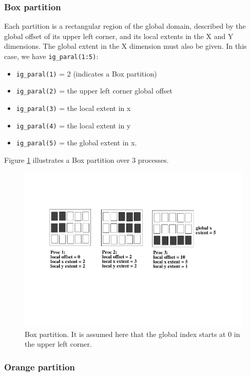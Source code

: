 \subsubsection{Box partition}

Each partition is a rectangular region of the global domain, described
by the global offset of its upper left corner, and its local extents
in the X and Y dimensions. The global extent in the X dimension must
also be given. In this case, we have {\tt ig\_paral(1:5)}:
\begin{itemize}
\item {\tt ig\_paral(1)} = 2 (indicates a Box partition)
\item {\tt ig\_paral(2)} = the upper left corner global offset
\item {\tt ig\_paral(3)} = the local extent in x
\item {\tt ig\_paral(4)} = the local extent in y
\item {\tt ig\_paral(5)} = the global extent in x.
\end{itemize}

Figure \ref{box_partition} illustrates a Box partition over 3
processes.
 
\begin{figure}
  \includegraphics[scale=.6]{figures/box_new}
  \caption{Box partition. It is assumed here that the global index starts at 0
    in the upper left corner.}
  \label{box_partition}
\end{figure}
  
\subsubsection{Orange partition}

